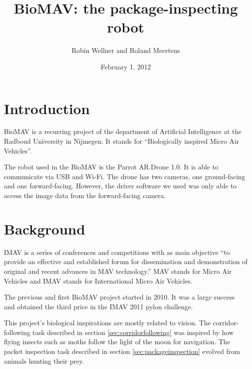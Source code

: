 \documentclass[a4paper,10pt]{article}
\begin{document}
\title{BioMAV: the package-inspecting robot}

\author{Robin Wellner and Roland Meertens}

\date{February 1, 2012}

\maketitle


\section{Introduction}
BioMAV is a recurring project of the department of Artificial
Intelligence at the Radboud University in Nijmegen. It stands for
``Biologically inspired Micro Air Vehicles''. 

The robot used in the BioMAV is the Parrot AR.Drone 1.0. It is able to
communicate via USB and Wi-Fi. The drone has two cameras, one
ground-facing and one forward-facing. However, the driver software we
used was only able to access the image data from the forward-facing
camera.

\section{Background}
\label{sec:background}
IMAV is a series of conferences and competitions with as main objective
``to provide an effective and established forum for dissemination and
demonstration of original and recent advances in MAV technology.''\cite{imav}
MAV stands for Micro Air Vehicles and IMAV stands for International
Micro Air Vehicles.

The previous and first BioMAV project started in 2010. It was a large
success and obtained the third price in the IMAV 2011 pylon challenge.

This project's biological inspirations are mostly related to vision. The
corridor-following task described in section \ref{sec:corridorfollowing} was inspired by how flying insects such as moths
follow the light of the moon for navigation. The packet inspection task described in section \ref{sec:packageinspection}
evolved from animals hunting their prey.
\end{document}
